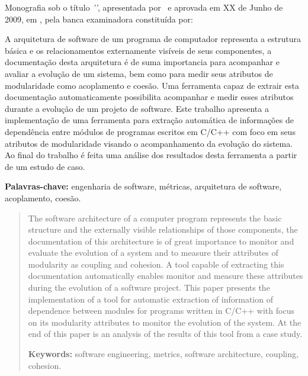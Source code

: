

\capa
\folhaderosto

\begin{folhadeaprovacao}
 Monografia sob o título \textit{'\ABNTtitulodata'}, apresentada por
 \ABNTautordata\ e aprovada em XX de Junho de 2009, em \ABNTlocaldata, pela
 banca examinadora constituída por:
\end{folhadeaprovacao}

\begin{resumo}
A arquitetura de software de um programa de computador representa a estrutura
básica e os relacionamentos externamente visíveis de seus componentes, a
documentação desta arquitetura é de suma importancia para acompanhar e avaliar
a evolução de um sistema, bem como para medir seus atributos de modularidade
como acoplamento e coesão. Uma ferramenta capaz de extrair esta documentação
automaticamente possibilita acompanhar e medir esses atributos durante a
evolução de um projeto de software. Este trabalho apresenta a implementação de
uma ferramenta para extração automática de informações de dependência entre
módulos de programas escritos em C/C++ com foco em seus atributos de
modularidade visando o acompanhamento da evolução do sistema. Ao final do
trabalho é feita uma análise dos resultados desta ferramenta a partir de um
estudo de caso.

{\bf Palavras-chave:} engenharia de software, métricas, arquitetura de
software, acoplamento, coesão.
\end{resumo}

\begin{abstract}
The software architecture of a computer program represents the basic structure
and the externally visible relationships of those components, the documentation
of this architecture is of great importance to monitor and evaluate the
evolution of a system and to measure their attributes of modularity as coupling
and cohesion. A tool capable of extracting this documentation automatically
enables monitor and measure these attributes during the evolution of a software
project. This paper presents the implementation of a tool for automatic
extraction of information of dependence between modules for programs written in
C/C++ with focus on its modularity attributes to monitor the evolution of the
system. At the end of this paper is an analysis of the results of this tool
from a case study.

{\bf Keywords:} software engineering, metrics, software architecture, coupling,
cohesion.
\end{abstract}

\sumario
\listadefiguras
\listadetabelas
\listadesiglas

{}
\clearpage
\apendice


